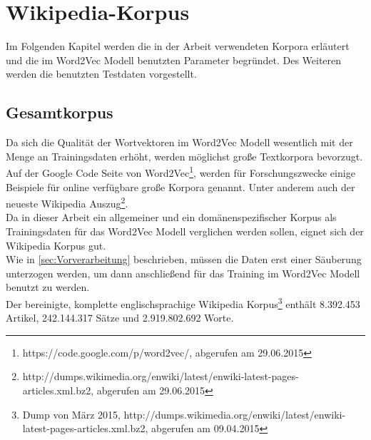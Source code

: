 \documentclass[12pt,a4paper]{report}
\begin{document}
	

	
	
\newpage
\chapter{Wikipedia-Korpus}
Im Folgenden Kapitel werden die in der Arbeit verwendeten Korpora erläutert und die im Word2Vec Modell benutzten Parameter begründet. Des Weiteren werden die benutzten Testdaten vorgestellt.

	\section{Gesamtkorpus}
	\label{sec:Gesamtkorpus}
	Da sich die Qualität  der Wortvektoren im Word2Vec Modell wesentlich mit der Menge an Trainingsdaten erhöht\citep{DBLP:journals/corr/abs-1301-3781}, werden möglichst große Textkorpora bevorzugt. Auf der Google Code Seite von Word2Vec\footnote{https://code.google.com/p/word2vec/, abgerufen am 29.06.2015}, werden für Forschungszwecke einige Beispiele für online verfügbare große Korpora genannt. Unter anderem auch der neueste Wikipedia Auszug\footnote{http://dumps.wikimedia.org/enwiki/latest/enwiki-latest-pages-articles.xml.bz2, abgerufen am 29.06.2015}.\\
	Da in dieser Arbeit ein allgemeiner und ein domänenspezifischer Korpus als Trainingsdaten für das Word2Vec Modell verglichen werden sollen, eignet sich der Wikipedia Korpus gut. \\
	Wie in \ref{sec:Vorverarbeitung} beschrieben, müssen die Daten erst einer Säuberung unterzogen werden, um dann anschließend für das Training im Word2Vec Modell benutzt zu werden.\\
	 Der bereinigte, komplette englischsprachige Wikipedia Korpus\footnote{Dump von März 2015, http://dumps.wikimedia.org/enwiki/latest/enwiki-latest-pages-articles.xml.bz2, abgerufen am 09.04.2015} enthält 8.392.453 Artikel, 242.144.317 Sätze und 2.919.802.692 Worte.\\
\end{document}

